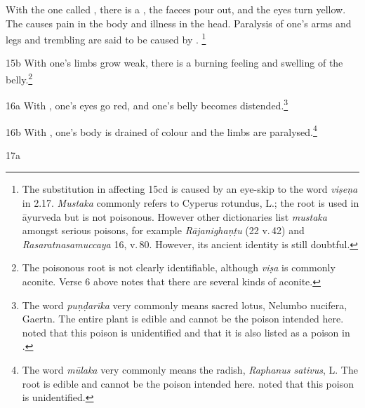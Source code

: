 \begin{translation}
    With the one called
    ,
    there is a , the faeces pour out, and  the eyes
    turn yellow.
The
causes pain in the body and illness in the head.
    Paralysis of one's arms and legs and trembling are said to be caused by
    .%
\footnote{The substitution 
    in  affecting 15cd is caused by an eye-skip to the word 
    \emph{viṣeṇa} in 2.17.  \emph{Mustaka} commonly refers to Cyperus 
    rotundus, L.; the root is used in āyurveda but is 
    not poisonous.  However other dictionaries list \emph{mustaka} amongst 
    serious poisons, for example \emph{Rājanighaṇṭu} (22 v.\,42) and 
    \emph{Rasaratnasamuccaya} 16, v.\,80.  However, its ancient identity is still 
    doubtful.}
    \item[ 15b]
    With 
    one's limbs grow weak, there is a burning
    feeling and swelling of the belly.\footnote{The poisonous root 
     is not clearly identifiable, although \emph{viṣa} 
    is commonly aconite.  Verse 6 above notes that there are several kinds of 
    aconite.}
    \item[ 16a]
    With ,
    one's eyes go red, and one's belly becomes distended.\footnote{The word 
    \emph{puṇḍarīka} very commonly means sacred lotus, Nelumbo nucifera, 
    Gaertn. The entire plant is edible and cannot be the poison intended here.  
    \citet[252]{gvdb} noted that this poison is unidentified and that it is also 
    listed as a poison in .}
    \item[ 16b]
    With ,
    one's body is drained of colour and the limbs are paralysed.\footnote{The word 
    \emph{mūlaka} very commonly means the radish, \emph{Raphanus sativus}, 
    L. The root is edible and cannot be the poison intended here.  
    \citet[317]{gvdb} noted that this poison is unidentified.}
    
    \item[ 17a]
        

\end{translation}

